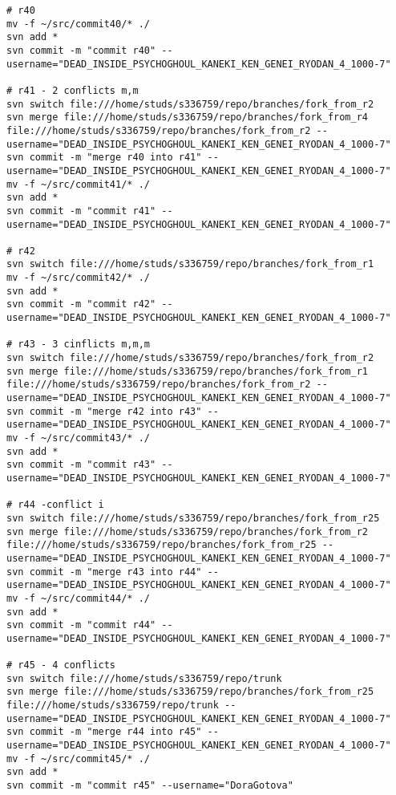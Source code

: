 \begin{verbatim}
# r40
mv -f ~/src/commit40/* ./
svn add *
svn commit -m "commit r40" --username="DEAD_INSIDE_PSYCHOGHOUL_KANEKI_KEN_GENEI_RYODAN_4_1000-7"

# r41 - 2 conflicts m,m
svn switch file:///home/studs/s336759/repo/branches/fork_from_r2
svn merge file:///home/studs/s336759/repo/branches/fork_from_r4 file:///home/studs/s336759/repo/branches/fork_from_r2 --username="DEAD_INSIDE_PSYCHOGHOUL_KANEKI_KEN_GENEI_RYODAN_4_1000-7"
svn commit -m "merge r40 into r41" --username="DEAD_INSIDE_PSYCHOGHOUL_KANEKI_KEN_GENEI_RYODAN_4_1000-7"
mv -f ~/src/commit41/* ./
svn add *
svn commit -m "commit r41" --username="DEAD_INSIDE_PSYCHOGHOUL_KANEKI_KEN_GENEI_RYODAN_4_1000-7"

# r42
svn switch file:///home/studs/s336759/repo/branches/fork_from_r1
mv -f ~/src/commit42/* ./
svn add *
svn commit -m "commit r42" --username="DEAD_INSIDE_PSYCHOGHOUL_KANEKI_KEN_GENEI_RYODAN_4_1000-7"

# r43 - 3 cinflicts m,m,m
svn switch file:///home/studs/s336759/repo/branches/fork_from_r2
svn merge file:///home/studs/s336759/repo/branches/fork_from_r1 file:///home/studs/s336759/repo/branches/fork_from_r2 --username="DEAD_INSIDE_PSYCHOGHOUL_KANEKI_KEN_GENEI_RYODAN_4_1000-7"
svn commit -m "merge r42 into r43" --username="DEAD_INSIDE_PSYCHOGHOUL_KANEKI_KEN_GENEI_RYODAN_4_1000-7"
mv -f ~/src/commit43/* ./
svn add *
svn commit -m "commit r43" --username="DEAD_INSIDE_PSYCHOGHOUL_KANEKI_KEN_GENEI_RYODAN_4_1000-7"

# r44 -conflict i
svn switch file:///home/studs/s336759/repo/branches/fork_from_r25
svn merge file:///home/studs/s336759/repo/branches/fork_from_r2 file:///home/studs/s336759/repo/branches/fork_from_r25 --username="DEAD_INSIDE_PSYCHOGHOUL_KANEKI_KEN_GENEI_RYODAN_4_1000-7"
svn commit -m "merge r43 into r44" --username="DEAD_INSIDE_PSYCHOGHOUL_KANEKI_KEN_GENEI_RYODAN_4_1000-7"
mv -f ~/src/commit44/* ./
svn add *
svn commit -m "commit r44" --username="DEAD_INSIDE_PSYCHOGHOUL_KANEKI_KEN_GENEI_RYODAN_4_1000-7"

# r45 - 4 conflicts
svn switch file:///home/studs/s336759/repo/trunk
svn merge file:///home/studs/s336759/repo/branches/fork_from_r25 file:///home/studs/s336759/repo/trunk --username="DEAD_INSIDE_PSYCHOGHOUL_KANEKI_KEN_GENEI_RYODAN_4_1000-7"
svn commit -m "merge r44 into r45" --username="DEAD_INSIDE_PSYCHOGHOUL_KANEKI_KEN_GENEI_RYODAN_4_1000-7"
mv -f ~/src/commit45/* ./
svn add *
svn commit -m "commit r45" --username="DoraGotova"
\end{verbatim}
\normalsize